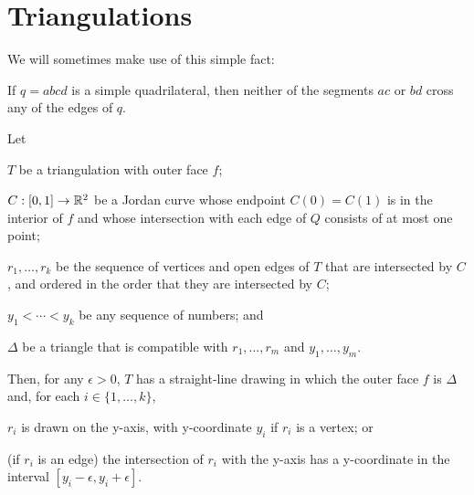 \documentclass{patmorin}
\begin{document}
\section{Triangulations}

We will sometimes make use of this simple fact:
\begin{obs}
  If $q=abcd$ is a simple quadrilateral, then neither of the segments $ac$
  or $bd$ cross any of the edges of $q$.
\end{obs}

\begin{thm}
   Let
   \begin{compactenum}
     \item  $T$ be a triangulation with outer face $f$;
     \item  $C:[0,1]\to\mathbb{R}^2$ be a Jordan curve whose endpoint $C(0)=C(1)$
            is in the interior of $f$ and whose intersection with each
            edge of $Q$ consists of at most one point;
     \item $r_1,\ldots,r_k$ be the sequence of vertices and open edges
           of $T$ that are intersected by $C$, and ordered in the order
           that they are intersected by $C$;
     \item $y_1<\cdots<y_k$ be any sequence of numbers; and
     \item $\Delta$ be a triangle that is compatible with 
           $r_1,\ldots,r_m$ and $y_1,\ldots,y_m$.
  \end{compactenum}
   Then, for any $\epsilon>0$, $T$ has a
   straight-line drawing in which the outer face $f$ is $\Delta$
   and, for each $i\in\{1,\ldots,k\}$, 
   \begin{compactenum}
       \item $r_i$ is drawn on the y-axis, with y-coordinate $y_i$
         if $r_i$ is a vertex; or
       \item (if $r_i$ is an edge) the intersection of $r_i$ with the
         y-axis has a y-coordinate in the interval
         $[y_i-\epsilon,y_i+\epsilon]$.
   \end{compactenum}
\end{thm}
\end{document}
